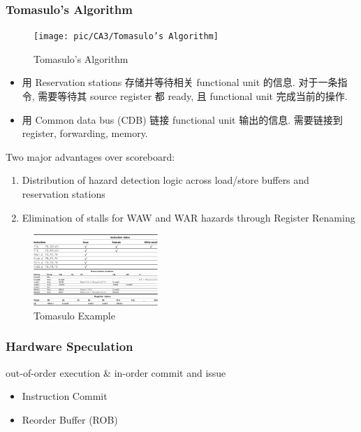\subsubsection{Tomasulo's Algorithm}
\begin{figure}[!htb]
    \centering
    \texttt{[image: pic/CA3/Tomasulo’s Algorithm]}
    \caption{Tomasulo's Algorithm}
\end{figure}


\begin{itemize}
    \item 用 Reservation stations 存储并等待相关 functional unit 的信息. 对于一条指令, 需要等待其 source register 都 ready, 且 functional unit 完成当前的操作. 
    \item 用 Common data bus (CDB) 链接 functional unit 输出的信息. 需要链接到 register, forwarding, memory. 
\end{itemize}

Two major advantages over scoreboard:
\begin{enumerate}\scriptsize
    \item Distribution of hazard detection logic
    across load/store buffers and
    reservation stations
    \item Elimination of stalls for WAW and WAR
    hazards through Register Renaming
\end{enumerate}

\begin{figure}[!htb]
    \centering
    \includegraphics[width=0.42\textwidth]{pic/CA3/Tomasulo Example}
    \caption{Tomasulo Example}
\end{figure}



\subsubsection{Hardware Speculation}
out-of-order execution \& in-order commit and issue
\begin{itemize}
    \item Instruction Commit
    \item Reorder Buffer (ROB)
\end{itemize}

